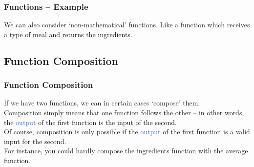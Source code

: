 \documentclass[aspectratio=169,11pt,dvipsnames,handout]{beamer}
\newcommand{\clr}{\textcolor{BrickRed}}
\newcommand{\clb}{\textcolor{RoyalBlue}}
\begin{document}
\begin{frame}
 \frametitle{Functions -- Example}
 We can also consider `non-mathematical' functions. Like a function which
 receives a type of meal and returns the ingredients.\\ \pause
 \begin{center}
 \end{center}
\end{frame}

\subsection{Function Composition}

\begin{frame}
 \subsectionpage
\end{frame}

\begin{frame}
 \frametitle{Function Composition}
 If we have \alert{two functions}, we can \alert{in certain cases} `compose'
 them. \\ \pause
 \alert{Composition} simply means that \alert{one function follows the other} --
 in other words, the \clb{output} of the first function is the \clr{input} of
 the second.\\ \pause
 Of course, \alert{composition} is only possible if the \clb{output} of the
 first function is a valid \clr{input} for the second. \\ \pause
 For instance, you could hardly compose the \alert{ingredients} function with
 the \alert{average} function.
\end{frame}
\end{document}

